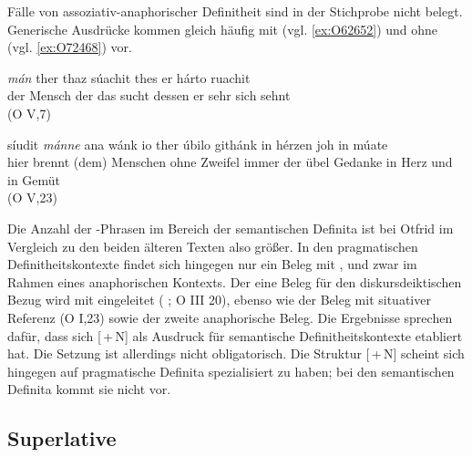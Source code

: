 
Fälle von assoziativ-anaphorischer Definitheit sind in der Stichprobe nicht belegt. Generische Ausdrücke kommen gleich häufig mit (vgl. \ref{ex:O62652}) und ohne (vgl. \ref{ex:O72468})  vor.

%

\begin{exe}
\ex \label{ex:O62652}  {\textit{mán}} {ther} {thaz} {súachit} {thes} {er} {hárto} {ruachit} \\
{der} {Mensch} {der} {das} {sucht} {dessen} {er} {sehr} {sich sehnt} \\
\glt   {} (O V,7)
%

\ex \label{ex:O72468}  {síudit} {\textit{mánne}} {ana} {wánk} {io} {ther} {úbilo} {githánk} {in} {hérzen} {joh} {in} {múate}  \\
{hier} {brennt} {(dem) Menschen} {ohne} {Zweifel} {immer} {der} {übel} {Gedanke} {in} {Herz} {und} {in} {Gemüt} \\
\glt   {}  (O V,23)
\end{exe}

Die Anzahl der -Phrasen im Bereich der semantischen Definita ist bei Otfrid im Vergleich zu den beiden älteren Texten also größer. In den pragmatischen Definitheitskontexte findet sich hingegen nur ein Beleg mit , und zwar im Rahmen eines anaphorischen Kontexts. Der eine Beleg für den diskursdeiktischen Bezug wird mit  eingeleitet ( ; O III 20), ebenso wie der Beleg mit situativer Referenz   (O I,23) sowie der zweite anaphorische Beleg. Die Ergebnisse sprechen dafür, dass sich [\,+\,N] als Ausdruck für semantische Definitheitskontexte etabliert hat. Die Setzung ist allerdings nicht obligatorisch. Die Struktur [\,+\,N] scheint sich hingegen auf pragmatische Definita spezialisiert zu haben; bei den semantischen Definita kommt sie nicht vor.

\subsection{Superlative}\label{sec:ergeb-superaltiv}

